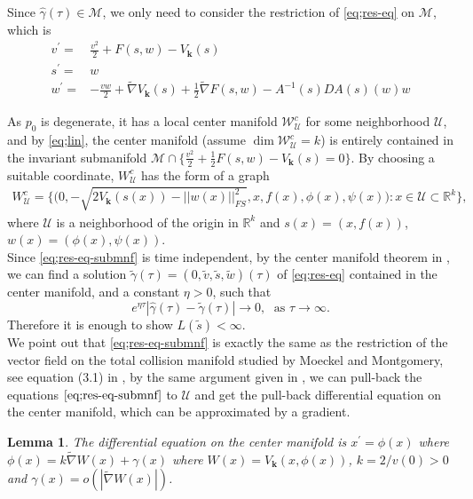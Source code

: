 \documentclass[11pt]{amsart}
\newtheorem{lemma}[theorem]{Lemma}
\theoremstyle{definition}
\theoremstyle{remark}
\numberwithin{equation}{section}
\newcommand{\gm}{\gamma}
\newcommand{\bk}{\mathbf k}
\begin{document}
Since $\hat{\gm}(\tau) \in \mathcal M$, we only need to consider the restriction of \eqref{eq;res-eq} on $\mathcal M$, which is
\begin{equation}
\label{eq;res-eq-submnf}
    \begin{aligned}
        v^\prime=&\frac{v^2}{2}+F(s,w)-V_{\mathbf{k}}(s)\\
        s^\prime=&w\\
        w^\prime=&-\frac{vw}{2}+\tilde{\nabla}V_{\mathbf{k}}(s)+\frac{1}{2}\tilde{\nabla}F(s,w)-A^{-1}(s)DA(s)(w)w
    \end{aligned}
\end{equation}

As $p_0$ is degenerate, it has a local center manifold $\mathcal{W}_{\mathcal{U}}^c$ for some neighborhood $\mathcal{U}$, and by \eqref{eq;lin}, the center manifold (assume $\dim \mathcal{W}_{\mathcal{U}}^c=k$) is entirely contained in the invariant submanifold $ \mathcal M \cap \{\frac{v^2}{2}+\frac{1}{2}F(s,w)-V_{\mathbf{k}}(s)=0\}$. By choosing a suitable coordinate, ${W}_{\mathcal{U}}^c$ has the form of a graph
\begin{align*}
    {W}_{\mathcal{U}}^c=\{\big(0,-\sqrt{2V_{\bk}(s(x))-||w(x)||_{FS}^2},x,f(x),\phi(x),\psi(x)\big):x\in\mathcal{U}\subset\mathbb{R}^k\},
\end{align*}
where $\mathcal{U}$ is a neighborhood of the origin in $\mathbb{R}^k$ and $s(x)=(x,f(x))$, $w(x)=(\phi(x),\psi(x))$.\\
\indent Since \eqref{eq;res-eq-submnf} is time independent, by the center manifold theorem in \cite[page 330]{Br03}, we can find a solution $\tilde \gm(\tau)=(0, \tilde v, \tilde s, \tilde w)(\tau)$ of \eqref{eq;res-eq} contained in the center manifold, and a constant $\eta>0$, such that 
$$ e^{\eta \tau} |\hat{\gm}(\tau) -\tilde{\gm}(\tau)| \to 0, \; \text{ as } \tau \to \infty. $$
Therefore it is enough to show $L(\tilde s) < \infty$.\\
\indent We point out that \eqref{eq;res-eq-submnf} is exactly the same as the restriction of the vector field on the total collision manifold studied by Moeckel and Montgomery, see equation (3.1) in \cite{MM25}, by the same argument given in \cite[Section 4]{MM25}, we can pull-back the equations $\eqref{eq;res-eq-submnf}$ to $\mathcal{U}$ and get the pull-back differential equation on the center manifold, which can be approximated by a gradient. 
\begin{lemma}\label{lem;flow-cen-manf}
    The differential equation on the center manifold is $x^\prime=\phi(x)$ where $\phi(x)=k\tilde{\nabla}W(x)+\gamma(x)$ where $W(x)=V_{\bk}(x,\phi(x))$, $k=2/v(0)>0$ and $\gamma(x)=o(|\tilde{\nabla}W(x)|)$.
\end{lemma}
\end{document}
